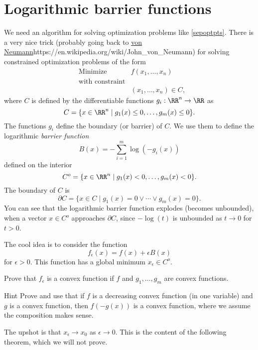 \documentclass{article}
\begin{document}
  
  \section{Logarithmic barrier functions}

  We need an algorithm for solving optimization problems like \eqref{sepoptpts}.
  There is a very nice trick (probably going back to \url{von Neumann}{https://en.wikipedia.org/wiki/John_von_Neumann}) for solving constrained optimization problems of the form
  \begin{align}\label{ip:co}
    &\text{Minimize} &f(x_1, \dots, x_n)\\
    &\text{with constraint}\\
    &&(x_1, \dots, x_n)\in C,
  \end{align}
  where $C$ is defined by the differentiable functions
  $g_i:\RR^n\rightarrow \RR$ as
  $$
  C = \{x\in \RR^n \mid g_1(x) \leq 0, \dots, g_m(x)\leq 0\}.
  $$
  The functions $g_i$ define the boundary (or barrier) of $C$. We use
  them to define the logarithmic \emph{barrier function}
  $$
  B(x) = - \sum_{i=1}^m \log(-g_i(x))
  $$
  defined on the interior
  $$
  C^o = \{x\in \RR^n \mid g_1(x) < 0, \dots, g_m(x) < 0\}.
  $$
  The boundary of $C$ is
  $$
  \partial C = \{x\in C \mid g_1(x) = 0 \vee \cdots \vee g_m(x) = 0\}.
  $$
  You can see that the logarithmic barrier function explodes (becomes unbounded), when a
  vector $x\in C^o$ approaches $\partial C$, since $-\log(t)$ is unbounded as $t\to 0$ for $t>0$.

  The cool idea is  to consider the function
  \begin{equation}\label{barrier}
  f_\epsilon(x) = f(x) + \epsilon B(x)
  \end{equation}
  for $\epsilon > 0$. This function has a global minimum $x_\epsilon\in C^o$.

  \beginshex
  Prove that $f_\epsilon$ is a convex function if $f$ and $g_1, \dots, g_m$ are
  convex functions.
   
  \begin{hideinbutton}{Hint}
    Prove and use that if $f$ is a decreasing convex function (in one variable) and $g$ is a convex function, then
    $f(-g(x))$ is a convex function, where we assume the composition makes sense.
  \end{hideinbutton}
  \endshex
  
  The upshot is that $x_\epsilon \to x_0$ as $\epsilon\to 0$. This is the content of the following theorem, which we will not prove.
\end{document}
